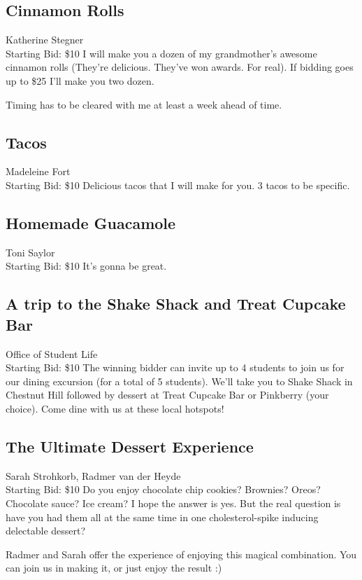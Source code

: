 \documentclass[11pt]{article}
\begin{document}
\subsection{Cinnamon Rolls}
Katherine Stegner
\\
Starting Bid: \$10
\newline
I will make you a dozen of my grandmother's awesome cinnamon rolls (They're delicious. They've won awards. For real). 
If bidding goes up to \$25 I'll make you two dozen.

Timing has to be cleared with me at least a week ahead of time.
\subsection{Tacos}
Madeleine Fort
\\
Starting Bid: \$10
\newline
Delicious tacos that I will make for you.  3 tacos to be specific.
\subsection{Homemade Guacamole}
Toni Saylor
\\
Starting Bid: \$10
\newline
It's gonna be great.
\subsection{A trip to the Shake Shack and Treat Cupcake Bar}
Office of Student Life
\\
Starting Bid: \$10
\newline
The winning bidder can invite up to 4 students to join us for our dining excursion (for a total of 5 students). We'll take you to Shake Shack in Chestnut Hill followed by dessert at Treat Cupcake Bar or Pinkberry (your choice).  Come dine with us at these local hotspots!
\subsection{The Ultimate Dessert Experience }
Sarah Strohkorb, Radmer van der Heyde
\\
Starting Bid: \$10
\newline
Do you enjoy chocolate chip cookies? Brownies? Oreos? Chocolate sauce? Ice cream? I hope the answer is yes. But the real question is have you had them all at the same time in one cholesterol-spike inducing delectable dessert? 

Radmer and Sarah offer the experience of enjoying this magical combination. You can join us in making it, or just enjoy the result :) 
\end{document}
